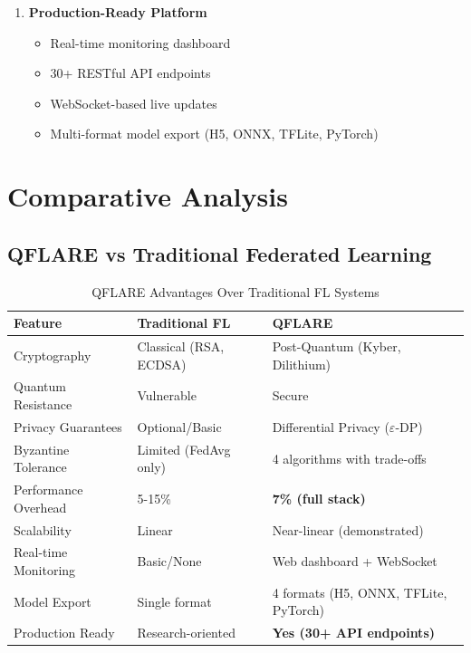 \documentclass[12pt,a4paper]{article}
\begin{document}
\begin{enumerate}
    \item \textbf{Production-Ready Platform}
    \begin{itemize}
        \item Real-time monitoring dashboard
        \item 30+ RESTful API endpoints
        \item WebSocket-based live updates
        \item Multi-format model export (H5, ONNX, TFLite, PyTorch)
    \end{itemize}
\end{enumerate}

\section{Comparative Analysis}

\subsection{QFLARE vs Traditional Federated Learning}

\begin{table}[H]
\centering
\caption{QFLARE Advantages Over Traditional FL Systems}
\begin{tabular}{p{4cm}p{5cm}p{5cm}}
\toprule
\textbf{Feature} & \textbf{Traditional FL} & \textbf{QFLARE} \\
\midrule
Cryptography & Classical (RSA, ECDSA) & Post-Quantum (Kyber, Dilithium) \\
Quantum Resistance & Vulnerable & Secure \\
Privacy Guarantees & Optional/Basic & Differential Privacy ($\varepsilon$-DP) \\
Byzantine Tolerance & Limited (FedAvg only) & 4 algorithms with trade-offs \\
Performance Overhead & 5-15\% & \textbf{7\% (full stack)} \\
Scalability & Linear & Near-linear (demonstrated) \\
Real-time Monitoring & Basic/None & Web dashboard + WebSocket \\
Model Export & Single format & 4 formats (H5, ONNX, TFLite, PyTorch) \\
Production Ready & Research-oriented & \textbf{Yes (30+ API endpoints)} \\
\bottomrule
\end{tabular}
\end{table}
\end{document}

